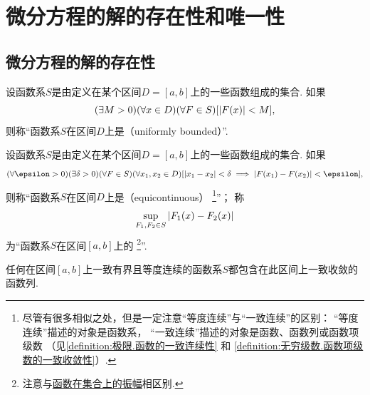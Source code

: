 \section{微分方程的解的存在性和唯一性}
\subsection{微分方程的解的存在性}
\begin{definition}\label{definition:微分方程.函数系的一致有界性}
设函数系\(S\)是由定义在某个区间\(D = [a,b]\)上的一些函数组成的集合.
如果\begin{equation*}
	(\exists M>0)
	(\forall x \in D)
	(\forall F \in S)
	[\abs{F(x)} < M],
\end{equation*}
则称“函数系\(S\)在区间\(D\)上是（uniformly bounded）”.
\end{definition}

\begin{definition}\label{definition:微分方程.函数系的等度连续性}
设函数系\(S\)是由定义在某个区间\(D = [a,b]\)上的一些函数组成的集合.
如果\begin{equation*}
	(\forall\epsilon>0)
	(\exists\delta>0)
	(\forall F \in S)
	(\forall x_1,x_2 \in D)
	[\abs{x_1-x_2} < \delta \implies \abs{F(x_1)-F(x_2)} < \epsilon],
\end{equation*}
则称“函数系\(S\)在区间\(D\)上是（equicontinuous）%
\footnote{尽管有很多相似之处，但是一定注意“等度连续”与“一致连续”的区别：
“等度连续”描述的对象是函数系，
“一致连续”描述的对象是函数、函数列或函数项级数
（见\cref{definition:极限.函数的一致连续性} 和
\cref{definition:无穷级数.函数项级数的一致收敛性}）.}”；
称\begin{equation*}
	\sup_{F_1,F_2 \in S} \abs{F_1(x)-F_2(x)}
\end{equation*}为“函数系\(S\)在区间\([a,b]\)上的%
\footnote{注意与\hyperref[definition:极限.函数在集合上的振幅]{函数在集合上的振幅}相区别.}”.
\end{definition}

\begin{lemma}\label{theorem:微分方程概论.阿斯科拉--阿尔泽拉引理}
任何在区间\([a,b]\)上一致有界且等度连续的函数系\(S\)都包含在此区间上一致收敛的函数列.
\end{lemma}

